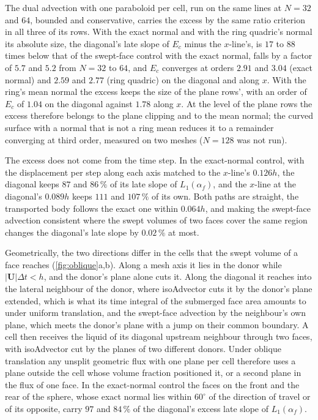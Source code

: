 \documentclass[preprint,12pt]{elsarticle}
\begin{document}
The dual advection with one paraboloid per cell, run on the same lines at $N = 32$ and $64$, bounded and conservative, carries the excess by the same ratio criterion in all three of its rows. With the exact normal and with the ring quadric's normal its absolute size, the diagonal's late slope of $E_c$ minus the $x$-line's, is $17$ to $88$ times below that of the swept-face control with the exact normal, falls by a factor of $5.7$ and $5.2$ from $N = 32$ to $64$, and $E_c$ converges at orders $2.91$ and $3.04$ (exact normal) and $2.59$ and $2.77$ (ring quadric) on the diagonal and along $x$. With the ring's mean normal the excess keeps the size of the plane rows', with an order of $E_c$ of $1.04$ on the diagonal against $1.78$ along $x$. At the level of the plane rows the excess therefore belongs to the plane clipping and to the mean normal; the curved surface with a normal that is not a ring mean reduces it to a remainder converging at third order, measured on two meshes ($N = 128$ was not run).

The excess does not come from the time step. In the exact-normal control, with the displacement per step along each axis matched to the $x$-line's $0.126h$, the diagonal keeps $87$ and $86\,\%$ of its late slope of $L_1(\alpha_f)$, and the $x$-line at the diagonal's $0.089h$ keeps $111$ and $107\,\%$ of its own. Both paths are straight, the transported body follows the exact one within $0.064h$, and making the swept-face advection consistent where the swept volumes of two faces cover the same region changes the diagonal's late slope by $0.02\,\%$ at most.

Geometrically, the two directions differ in the cells that the swept volume of a face reaches (\cref{fig:oblique}a,b). Along a mesh axis it lies in the donor while $|\mathbf{U}|\Delta t < h$, and the donor's plane alone cuts it. Along the diagonal it reaches into the lateral neighbour of the donor, where isoAdvector cuts it by the donor's plane extended, which is what its time integral of the submerged face area amounts to under uniform translation, and the swept-face advection by the neighbour's own plane, which meets the donor's plane with a jump on their common boundary. A cell then receives the liquid of its diagonal upstream neighbour through two faces, with isoAdvector cut by the planes of two different donors. Under oblique translation any unsplit geometric flux with one plane per cell therefore uses a plane outside the cell whose volume fraction positioned it, or a second plane in the flux of one face. In the exact-normal control the faces on the front and the rear of the sphere, whose exact normal lies within $60^\circ$ of the direction of travel or of its opposite, carry $97$ and $84\,\%$ of the diagonal's excess late slope of $L_1(\alpha_f)$.
\end{document}
